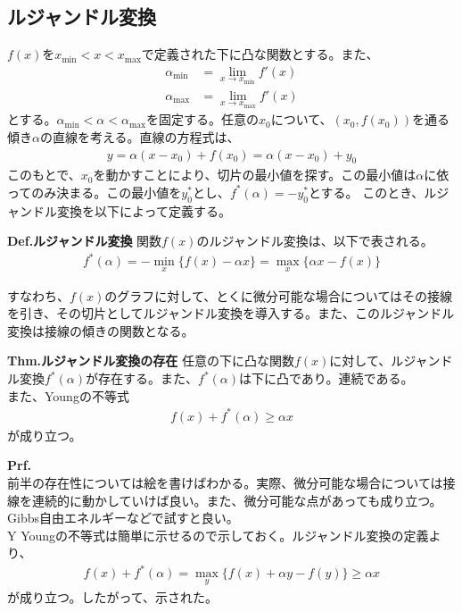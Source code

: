 \documentclass[a4paper,11pt]{jsarticle}
\numberwithin{equation}{section}
\begin{document}
\subsection{ルジャンドル変換}
$f(x)$を$x_{\text{min}} < x < x_{\text{max}}$で定義された下に凸な関数とする。また、
\begin{align}
  \alpha_{\text{min}}  &= \lim_{x \to x_{\text{min}}} f'(x)\\
  \alpha_{\text{max}}  &= \lim_{x \to x_{\text{max}}} f'(x)
\end{align}
とする。$\alpha_{\text{min}}<\alpha < \alpha_{\text{max}}$を固定する。任意の$x_0$について、$(x_0,f(x_0))$を通る傾き$\alpha$の直線を考える。直線の方程式は、
\begin{align}
  y = \alpha(x-x_0) + f(x_0) = \alpha (x-x_0) + y_0
\end{align}
このもとで、$x_0$を動かすことにより、切片の最小値を探す。この最小値は$\alpha$に依ってのみ決まる。この最小値を$y^{*}_{0}$とし、$f^{*} (\alpha) = -y^{*}_{0}$とする。
このとき、ルジャンドル変換を以下によって定義する。
\begin{itembox}[l]{\textbf{Def.ルジャンドル変換}}
  関数$f(x)$のルジャンドル変換は、以下で表される。
  \begin{align}
    f^*(\alpha) = -\min_x \{f(x) - \alpha x\} = \max_x \{\alpha x - f(x)\}
  \end{align}
\end{itembox}
すなわち、$f(x)$のグラフに対して、とくに微分可能な場合についてはその接線を引き、その切片としてルジャンドル変換を導入する。また、このルジャンドル変換は接線の傾きの関数となる。\\

\begin{itembox}[l]{\textbf{Thm.ルジャンドル変換の存在}}
  任意の下に凸な関数$f(x)$に対して、ルジャンドル変換$f^*(\alpha)$が存在する。また、$f^*(\alpha)$は下に凸であり。連続である。\\
  また、Youngの不等式
  \begin{align}
    f(x) + f^*(\alpha) \geq \alpha x
  \end{align}
  が成り立つ。
\end{itembox}
\textbf{Prf.}\\
前半の存在性については絵を書けばわかる。実際、微分可能な場合については接線を連続的に動かしていけば良い。また、微分可能な点があっても成り立つ。Gibbs自由エネルギーなどで試すと良い。\\Y
Youngの不等式は簡単に示せるので示しておく。ルジャンドル変換の定義より、
\begin{align}
  f(x) + f^*(\alpha) = \max_{y} \{f(x)+\alpha y - f(y)\} \geq\alpha x
\end{align}
が成り立つ。したがって、示された。\hfill\qedsymbol\\
\end{document}
